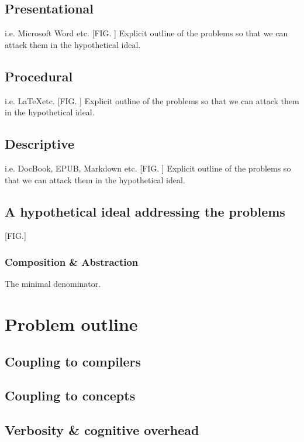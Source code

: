 \documentclass{scrreprt}
\begin{document}
\subsection{Presentational}
i.e. Microsoft Word etc.
[FIG. ]
Explicit outline of the problems so that we can attack them in the hypothetical ideal.

\subsection{Procedural}
i.e. \LaTeX etc.
[FIG. ]
Explicit outline of the problems so that we can attack them in the hypothetical ideal.

\subsection{Descriptive}
i.e. DocBook, EPUB, Markdown etc.
[FIG. ]
Explicit outline of the problems so that we can attack them in the hypothetical ideal.

\subsection{A hypothetical ideal addressing the problems}
[FIG.]

\subsubsection{Composition \& Abstraction}
The minimal denominator.



















\section{Problem outline}
\subsection{Coupling to compilers}
\subsection{Coupling to concepts}
\subsection{Verbosity \& cognitive overhead}
\end{document}
